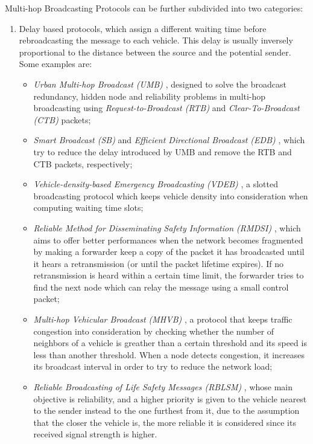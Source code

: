 		Multi-hop Broadcasting Protocols can be further subdivided into two categories:
		\begin{enumerate}
			\item Delay based protocols, which assign a different waiting time before rebroadcasting the message to each vehicle. This delay is usually inversely proportional to the distance between the source and the potential sender.
			Some examples are:
			\begin{itemize}
				\renewcommand\labelitemi{--}
				\item \textit{Urban Multi-hop Broadcast (UMB)} \cite{Korkmaz:2004:UMB:1023875.1023887}, designed to solve the broadcast redundancy, hidden node and reliability problems in multi-hop broadcasting using \textit{Request-to-Broadcast (RTB)} and \textit{Clear-To-Broadcast (CTB)} packets; 
				\item \textit{Smart Broadcast (SB)} \cite{4025102} and \textit{Efficient Directional Broadcast (EDB)} \cite{4340158}, which try to reduce the delay introduced by UMB and remove the RTB and CTB packets, respectively;
				\item \textit{Vehicle-density-based Emergency Broadcasting (VDEB)} \cite{5663803}, a slotted broadcasting protocol which keeps vehicle density into consideration when computing waiting time slots;
				\item \textit{Reliable Method for Disseminating Safety Information
				(RMDSI)} \cite{4591259}, which aims to offer better performances when the network becomes fragmented by making a forwarder keep a copy of the packet it has broadcasted until it hears a retransmission (or until the packet lifetime expires). If no retransmission is heard within a certain time limit, the forwarder tries to find the next node which can relay the message using a small control packet;
				\item \textit{Multi-hop Vehicular Broadcast (MHVB)} \cite{4068699}, a protocol that keeps traffic congestion into consideration by   checking whether the number of neighbors of a vehicle is greather than a certain threshold and its speed is less than another threshold. When a node detects congestion, it increases its broadcast interval in order to try to reduce the network load;
				\item \textit{Reliable Broadcasting of Life Safety Messages (RBLSM)} \cite{4458046}, whose main objective is reliability, and a higher priority is given to the vehicle nearest to the sender instead to the one furthest from it, due to the assumption that the closer the vehicle is, the more reliable it is considered since its received signal strength is higher.
			\end{itemize}
		

\end{enumerate}
